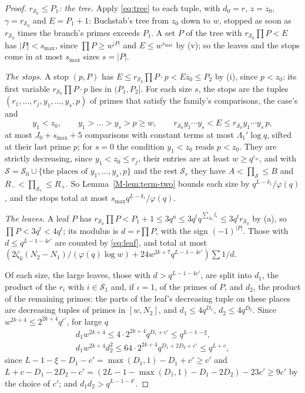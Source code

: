 \documentclass[11pt]{article}
\numberwithin{equation}{section}
\begin{document}
\begin{proof}
\emph{$r_{\mathcal S_0} \le P_1$: the tree.} Apply \eqref{eq:tree} to each tuple, with $d_0 = r$, $z = z_0$, $\gamma =
r_{\mathcal S_0}$ and $E = P_1 + 1$: Buchstab's tree from $z_0$ down to $w$, stopped as soon as $r_{\mathcal S_0}$ times
the branch's primes exceeds $P_1$. A set $P$ of the tree with $r_{\mathcal S_0} \prod P < E$ has $|P| < s_{\max}$, since
$\prod P \ge w^{|P|}$ and $E \le w^{s_{\max}}$ by (v); so the leaves and the stops come in at most $s_{\max}$ sizes $s =
|P|$.

\emph{The stops.} A stop $(p, P)$ has $E \le r_{\mathcal S_0} \prod P \cdot p < E z_0 \le P_2$ by (i), since $p < z_0$:
its first variable $r_{\mathcal S_0} \prod P \cdot p$ lies in $(P_1, P_2]$. For each size $s$, the stops are the tuples
$(r_1, \dots, r_j, y_1, \dots, y_s, p)$ of primes that satisfy the family's comparisons, the case's and
\[
  y_1 < z_0, \qquad y_1 > \dots > y_s > p \ge w, \qquad r_{\mathcal S_0} y_1 \cdots y_s < E \le r_{\mathcal S_0} y_1
  \cdots y_s \, p,
\]
at most $J_0 + s_{\max} + 5$ comparisons with constant terms at most $\Lambda_1' \log q$, sifted at their last prime
$p$; for $s = 0$ the condition $y_1 < z_0$ reads $p < z_0$. They are strictly decreasing, since $y_1 < z_0 \le r_j$,
their entries are at least $w \ge q^{\varepsilon_w}$, and with $\mathcal S = \mathcal S_0 \cup \{\text{the places of }
y_1, \dots, y_s, p\}$ and the rest $\mathcal S_r$ they have $A < \prod_{\mathcal S} \le B$ and $R_- < \prod_{\mathcal
S_r} \le R_+$. So Lemma~\ref{M-lem:term-two} bounds each size by $q^{L - \delta_1}/\varphi(q)$, and the stops total at
most $s_{\max} q^{L - \delta_1}/\varphi(q)$.

\emph{The leaves.} A leaf $P$ has $r_{\mathcal S_0} \prod P < P_1 + 1 \le 3q^u \le 3q^t q^{\sum_{\mathcal S_0} l_i} \le
3q^t r_{\mathcal S_0}$ by (a), so $\prod P < 3q^t < 4q^t$; its modulus is $d = r \prod P$, with the sign $(-1)^{|P|}$.
Those
with $d \le q^{L - 1 - 4c'}$ are counted by \eqref{eq:leaf}, and total at most $(2\zeta_k (N_2 - N_1)/(\varphi(q) \log
w) + 24 w^{2k + 7} q^{L - 1 - 4c'}) \sum 1/d$.

Of each size, the large leaves, those with $d > q^{L - 1 - 4c'}$, are split into $d_1$, the product of the $r_i$
with $i \in \mathcal S_1$ and, if $\iota = 1$, of the primes of $P$, and $d_2$, the product of the remaining primes:
the parts of
the leaf's decreasing tuple on these places are decreasing tuples of primes in $[w, N_2]$, and $d_1 \le 4q^{D_1}$, $d_2
\le 4q^{D_2}$. Since $w^{2k + 4} \le 2^{2k + 4} q^{c'}$, for large $q$
\begin{gather*}
  d_1 w^{2k + 4} \le 4 \cdot 2^{2k + 4} q^{D_1 + c'} \le q^{L - 1 - \xi}, \\
  d_1 w^{2k + 4} d_2^2 \le 64 \cdot 2^{2k + 4} q^{D_1 + 2D_2 + c'} \le q^{L + c},
\end{gather*}
since $L - 1 - \xi - D_1 - c' = \max(D_1, 1) - D_1 + c' \ge c'$ and $L + c - D_1 - 2D_2 - c' = (2L - 1 - \max(D_1, 1) -
D_1 - 2D_2) - 23c' \ge 9c'$ by the choice of $c'$; and $d_1 d_2 > q^{L - 1 - \delta'}$.


\end{proof}
\end{document}

